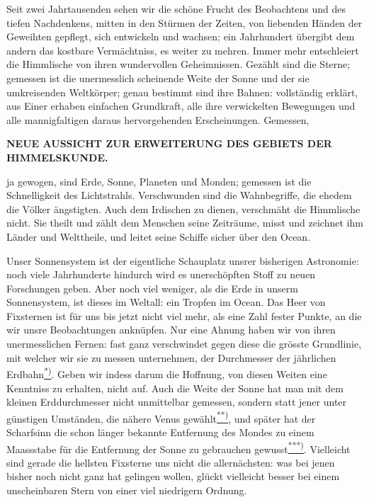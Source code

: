 Seit zwei Jahrtausenden sehen wir die schöne Frucht des Beobachtens und des tiefen Nachdenkens, mitten in den Stürmen der Zeiten, von liebenden Händen der Geweihten gepflegt, sich entwickeln und wachsen; ein Jahrhundert übergibt dem andern das kostbare Vermächtniss, es weiter zu mehren. Immer mehr entschleiert die Himmlische von ihren wundervollen Geheimnissen. Gezählt sind die Sterne; gemessen ist die unermesslich scheinende Weite der Sonne und der sie umkreisenden Weltkörper; genau bestimmt sind ihre Bahnen: vollständig erklärt, aus Einer erhaben einfachen Grundkraft, alle ihre verwickelten Bewegungen und alle mannigfaltigen daraus hervorgehenden Erscheinungen. Gemessen,
\par\clearpage
\thispagestyle{empty}
\noindent{}%
%
\parbox[t]{\dimexpr\linewidth-20mm\relax}{\centering\fontsize{7}{8.5}\selectfont\bfseries NEUE AUSSICHT ZUR ERWEITERUNG DES GEBIETS DER HIMMELSKUNDE.\par}%
\makebox[10mm][r]{}\par\nobreak\medskip
\noindent ja gewogen, sind Erde, Sonne, Planeten und Monden; gemessen ist die Schnelligkeit des Lichtstrahls. Verschwunden sind die Wahnbegriffe, die ehedem die Völker ängstigten. Auch dem Irdischen zu dienen, verschmäht die Himmlische nicht. Sie theilt und zählt dem Menschen seine Zeiträume, misst und zeichnet ihm Länder und Welttheile, und leitet seine Schiffe sicher über den Ocean.

Unser Sonnensystem ist der eigentliche Schauplatz unsrer bisherigen Astronomie: noch viele Jahrhunderte hindurch wird es unerschöpften Stoff zu neuen Forschungen geben. Aber noch viel weniger, als die Erde in unserm Sonnensystem, ist dieses im Weltall: ein Tropfen im Ocean. Das Heer von Fixsternen ist für uns bis jetzt nicht viel mehr, als eine Zahl fester Punkte, an die wir unsre Beobachtungen anknüpfen. Nur eine Ahnung haben wir von ihren unermesslichen Fernen: fast ganz verschwindet gegen diese die grösste Grundlinie, mit welcher wir sie zu messen unternehmen, der Durchmesser der jährlichen Erdbahn\hyperlink{native-187-note-13}{\textsuperscript{*)}}. Geben wir indess darum die Hoffnung, von diesen Weiten eine Kenntniss zu erhalten, nicht auf. Auch die Weite der Sonne hat man mit dem kleinen Erddurchmesser nicht unmittelbar gemessen, sondern statt jener unter günstigen Umständen, die nähere Venus gewählt\hyperlink{native-187-note-14}{\textsuperscript{**)}}, und später hat der Scharfsinn die schon länger bekannte Entfernung des Mondes zu einem Maassstabe für die Entfernung der Sonne zu gebrauchen gewusst\hyperlink{native-187-note-15}{\textsuperscript{***)}}. Vielleicht sind gerade die hellsten Fixsterne uns nicht die allernächsten: was bei jenen bisher noch nicht ganz hat gelingen wollen, glückt vielleicht besser bei einem unscheinbaren Stern von einer viel niedrigern Ordnung.

